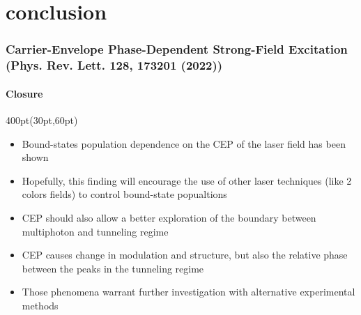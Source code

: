 
\section{conclusion}

\begin{frame}
\frametitle{Carrier-Envelope Phase-Dependent Strong-Field Excitation \\
\small (Phys. Rev. Lett. \textbf{128}, 173201 (2022))}
\framesubtitle{Closure}

\small
\begin{textblock*}{400pt}(30pt,60pt)
\begin{itemize}
\footnotesize
\item Bound-states population dependence on the CEP of the laser field 
has been shown
\item Hopefully, this finding will encourage the use of other 
laser techniques (like 2 colors fields) to control bound-state popualtions
\item CEP should also allow a better exploration of the boundary between 
multiphoton and tunneling regime
\item CEP causes change in modulation and structure, 
but also the relative phase between the peaks in the tunneling regime

\vspace{20pt}

\item Those phenomena warrant further investigation 
with alternative experimental methods
\end{itemize}

\end{textblock*}



\end{frame}
